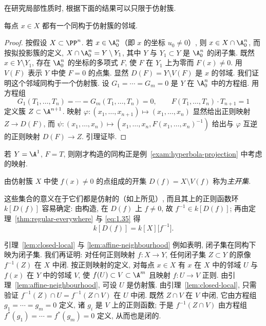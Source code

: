在研究局部性质时, 根据下面的结果可以只限于仿射簇.

\begin{lemma}\label{lem:affine-neighbourhood}
	每点 $x \in X$ 都有一个同构于仿射簇的邻域.
\end{lemma}

\begin{proof}
	按假设 $X \subset \PP^n$. 若 $x \in \A^n_0$（即 $x$ 的坐标 $u_0 \ne 0$）, 则 $x \in X \cap \A^n_0$, 而按拟投影簇的定义, $X \cap \A^n_0 = Y \setminus Y_1$, 其中 $Y$ 与 $Y_1 \subset Y$ 是 $\A^n_0$ 的闭子集. 既然 $x \in Y \setminus Y_1$, 存在 $\A^n_0$ 的坐标的多项式 $F$, 使 $F$ 在 $Y_1$ 上为零而 $F(x) \ne 0$. 用 $V(F)$ 表示 $Y$ 中使 $F = 0$ 的点集. 显然 $D(F) = Y \setminus V(F)$ 是 $x$ 的邻域. 我们证明这个邻域同构于一个仿射簇. 设 $G_1 = \cdots = G_m = 0$ 是 $Y$ 在 $\A^n_0$ 中的方程组. 用方程组
	\begin{equation}
		\label{eq:1.35}
		G_1(T_1, \ldots, T_n) = \cdots = G_m(T_1, \ldots, T_n) = 0, \qquad F(T_1, \ldots, T_n) \cdot T_{n+1} = 1
	\end{equation}
	定义簇 $Z \subset \A^{n+1}$. 映射 $\varphi: (x_1, \ldots, x_{n+1}) \mapsto (x_1, \ldots, x_n)$ 显然给出正则映射 $Z \to D(F)$, 而 $\psi: (x_1, \ldots, x_n) \mapsto (x_1, \ldots, x_n, F(x_1, \ldots, x_n)^{-1})$ 给出与 $\varphi$ 互逆的正则映射 $D(F) \to Z$. 引理证毕.
\end{proof}

若 $Y = \A^1$, $F = T$, 则刚才构造的同构正是例~\ref{exam:hyperbola-projection} 中考虑的映射.

\begin{definition}[主开集]\label{def:principal-open}
	由仿射簇 $X$ 中使 $f(x) \ne 0$ 的点组成的开集 $D(f) = X \setminus V(f)$ 称为\emph{主开集}.
\end{definition}

这些集合的意义在于它们都是仿射的（如上所见）, 而且其上的正则函数环 $k[D(f)]$ 容易确定: 由构造, 在 $D(f)$ 上 $f \ne 0$, 故 $f^{-1} \in k[D(f)]$; 再由定理~\ref{thm:regular-everywhere} 与 \eqref{eq:1.35} 得
\[
	k[D(f)] = k[X]\bigl[ f^{-1} \bigr].
\]

引理~\ref{lem:closed-local} 与 \ref{lem:affine-neighbourhood} 例如表明, 闭子集在同构下映为闭子集. 我们再证明: 对任何正则映射 $f: X \to Y$, 任何闭子集 $Z \subset Y$ 的原像 $f^{-1}(Z)$ 在 $X$ 中闭. 按正则映射的定义, 对每点 $x \in X$ 有 $x$ 在 $X$ 中的邻域 $U$ 与 $f(x)$ 在 $Y$ 中的邻域 $V$, 使 $f(U) \subset V \subset \A^m$ 且映射 $f: U \to V$ 正则. 由引理~\ref{lem:affine-neighbourhood}, 可设 $U$ 是仿射簇. 由引理~\ref{lem:closed-local}, 只需验证 $f^{-1}(Z) \cap U = f^{-1}(Z \cap V)$ 在 $U$ 中闭. 既然 $Z \cap V$ 在 $V$ 中闭, 它由方程组 $g_1 = \cdots = g_m = 0$ 定义, 诸 $g_i$ 是 $V$ 上的正则函数; 于是 $f^{-1}(Z \cap V)$ 由方程组 $f^*(g_1) = \cdots = f^*(g_m) = 0$ 定义, 从而也是闭的.

